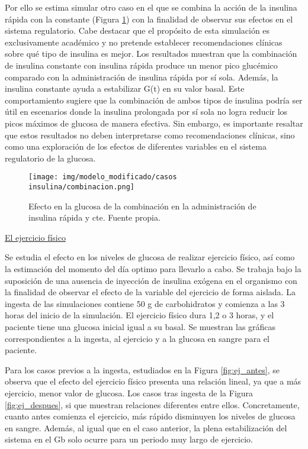 Por ello se estima simular otro caso en el que se combina la acción de la insulina rápida con la constante (Figura \ref{fig:comb_rap_cte}) con la finalidad de observar sus efectos en el sistema regulatorio.  Cabe destacar que el propósito de esta simulación es exclusivamente académico y no pretende establecer recomendaciones clínicas sobre qué tipo de insulina es mejor.
Los resultados muestran que la combinación de insulina constante con insulina rápida produce un menor pico glucémico comparado con la administración de insulina rápida por sí sola. Además, la insulina constante ayuda a estabilizar G(t) en su valor basal. Este comportamiento sugiere que la combinación de ambos tipos de insulina podría ser útil en escenarios donde la insulina prolongada por sí sola no logra reducir los picos máximos de glucosa de manera efectiva. Sin embargo, es importante resaltar que estos resultados no deben interpretarse como recomendaciones clínicas, sino como una exploración de los efectos de diferentes variables en el sistema regulatorio de la glucosa.

\begin{figure}[htbp]
    \centering
    \texttt{[image: img/modelo\_modificado/casos insulina/combinacion.png]}
    \caption{Efecto en la glucosa de la combinación en la administración de insulina rápida y cte. Fuente propia.}
    \label{fig:comb_rap_cte}
\end{figure}

\underline{El ejercicio físico} 

Se estudia el efecto en los niveles de glucosa de realizar ejercicio físico, así como la estimación del momento del día optimo para llevarlo a cabo. Se trabaja bajo la suposición de una ausencia de inyección de insulina exógena en el organismo con la finalidad de observar el efecto de la variable del ejercicio de forma aislada. La ingesta de las simulaciones contiene 50 g de carbohidratos y comienza a las 3 horas del inicio de la simulación. El ejercicio físico dura 1,2 o 3 horas, y el paciente tiene una glucosa inicial igual a su basal. Se muestran las gráficas correspondientes a la ingesta, al ejercicio y a la glucosa en sangre para el paciente.

Para los casos previos a la ingesta, estudiados en la Figura \ref{fig:ej_antes}, se observa que el efecto del ejercicio físico presenta una relación lineal, ya que a más ejercicio, menor valor de glucosa. Los casos tras ingesta de la Figura \ref{fig:ej_despues}, si que muestran relaciones diferentes entre ellos. Concretamente, cuanto antes comienza el ejercicio, más rápido disminuyen los niveles de glucosa en sangre. Además, al igual que en el caso anterior, la plena estabilización del sistema en el Gb solo ocurre para un periodo muy largo de ejercicio. 


